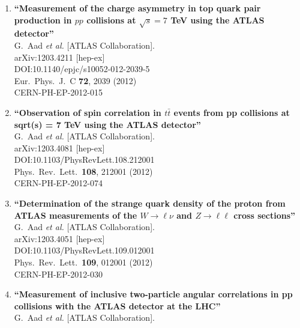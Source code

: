 \documentclass{article}
\begin{document}
\begin{enumerate}
\item%
{\bf ``Measurement of the charge asymmetry in top quark pair production in $pp$ collisions at $\sqrt{s}=7$ TeV using the ATLAS detector''}
  \\{}G.~Aad {\it et al.} [ATLAS Collaboration].
  \\{}arXiv:1203.4211 [hep-ex]
  \\{}DOI:10.1140/epjc/s10052-012-2039-5
  \\{}Eur.\ Phys.\ J.\ C {\bf 72}, 2039 (2012)
  \\{}CERN-PH-EP-2012-015
\item%
{\bf ``Observation of spin correlation in $t \bar{t}$ events from pp collisions at sqrt(s) = 7 TeV using the ATLAS detector''}
  \\{}G.~Aad {\it et al.} [ATLAS Collaboration].
  \\{}arXiv:1203.4081 [hep-ex]
  \\{}DOI:10.1103/PhysRevLett.108.212001
  \\{}Phys.\ Rev.\ Lett.\  {\bf 108}, 212001 (2012)
  \\{}CERN-PH-EP-2012-074
\item%
{\bf ``Determination of the strange quark density of the proton from ATLAS measurements of the $W \to \ell \nu$ and $Z \to \ell\ell$ cross sections''}
  \\{}G.~Aad {\it et al.} [ATLAS Collaboration].
  \\{}arXiv:1203.4051 [hep-ex]
  \\{}DOI:10.1103/PhysRevLett.109.012001
  \\{}Phys.\ Rev.\ Lett.\  {\bf 109}, 012001 (2012)
  \\{}CERN-PH-EP-2012-030
\item%
{\bf ``Measurement of inclusive two-particle angular correlations in pp collisions with the ATLAS detector at the LHC''}
  \\{}G.~Aad {\it et al.} [ATLAS Collaboration].

\end{enumerate}
\end{document}
